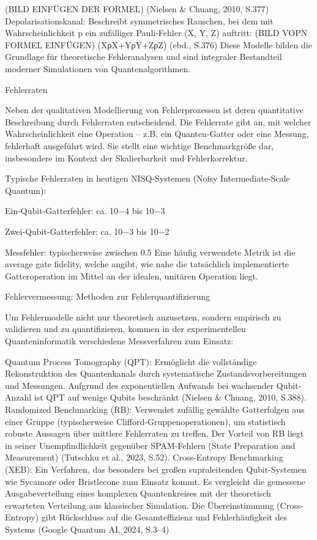 (BILD EINFÜGEN DER FORMEL)
(Nielsen & Chuang, 2010, S.377)
Depolarisationskanal: Beschreibt symmetrisches Rauschen, bei dem mit Wahrscheinlichkeit p ein zufälliger Pauli-Fehler (X, Y, Z) auftritt:
(BILD VOPN FORMEL EINFÜGEN)
 (XρX+YρY+ZρZ)
(ebd., S.376)
Diese Modelle bilden die Grundlage für theoretische Fehleranalysen und sind integraler Bestandteil moderner Simulationen von Quantenalgorithmen.

Fehlerraten

Neben der qualitativen Modellierung von Fehlerprozessen ist deren quantitative Beschreibung durch Fehlerraten entscheidend. Die Fehlerrate gibt an, mit welcher Wahrscheinlichkeit eine Operation – z.B. ein Quanten-Gatter oder eine Messung, fehlerhaft ausgeführt wird. Sie stellt eine wichtige Benchmarkgröße dar, insbesondere im Kontext der Skalierbarkeit und Fehlerkorrektur.

Typische Fehlerraten in heutigen NISQ-Systemen (Noisy Intermediate-Scale Quantum):

Ein-Qubit-Gatterfehler: ca. 10−4 bis 10−3
 
Zwei-Qubit-Gatterfehler: ca. 
10−3 bis 10−2
 
Messfehler: typischerweise zwischen  0.5%
Eine häufig verwendete Metrik ist die average gate fidelity, welche angibt, wie nahe die tatsächlich implementierte Gatteroperation im Mittel an der idealen, unitären Operation liegt.

Fehlervermessung: Methoden zur Fehlerquantifizierung

Um Fehlermodelle nicht nur theoretisch anzusetzen, sondern empirisch zu validieren und zu quantifizieren, kommen in der experimentellen Quanteninformatik verschiedene Messverfahren zum Einsatz:

Quantum Process Tomography (QPT): Ermöglicht die vollständige Rekonstruktion des Quantenkanals durch systematische Zustandsvorbereitungen und Messungen. Aufgrund des exponentiellen Aufwands bei wachsender Qubit-Anzahl ist QPT auf wenige Qubits beschränkt (Nielsen & Chuang, 2010, S.388).
Randomized Benchmarking (RB): Verwendet zufällig gewählte Gatterfolgen aus einer Gruppe (typischerweise Clifford-Gruppenoperationen), um statistisch robuste Aussagen über mittlere Fehlerraten zu treffen. Der Vorteil von RB liegt in seiner Unempfindlichkeit gegenüber SPAM-Fehlern (State Preparation and Measurement) (Tutschku et al., 2023, S.52).
Cross-Entropy Benchmarking (XEB): Ein Verfahren, das besonders bei großen supraleitenden Qubit-Systemen wie Sycamore oder Bristlecone zum Einsatz kommt. Es vergleicht die gemessene Ausgabeverteilung eines komplexen Quantenkreises mit der theoretisch erwarteten Verteilung aus klassischer Simulation. Die Übereinstimmung (Cross-Entropy) gibt Rückschluss auf die Gesamteffizienz und Fehlerhäufigkeit des Systems (Google Quantum AI, 2024, S.3–4)

